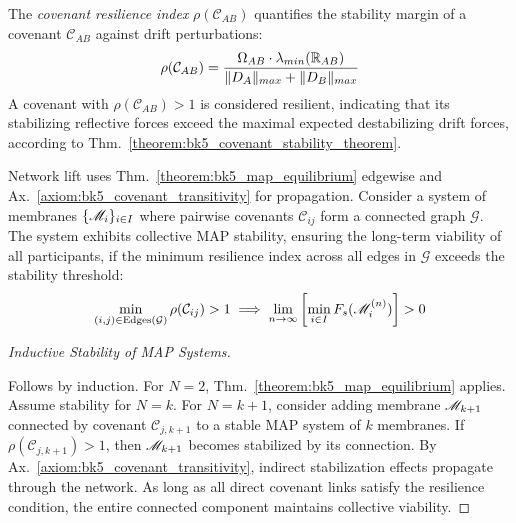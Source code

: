 \begin{definition} \label{definition:bk5_covenant_resilience_index}
The \emph{covenant resilience index} $\rho(\mathcal{C}_{AB})$ quantifies the stability margin of a covenant $\mathcal{C}_{AB}$ against drift perturbations:
\begin{equation}
\rho(\mathcal{C}_{AB}) = \frac{\Omega_{AB} \cdot \lambda_{min}(\mathbb{R}_{AB})}{\|D_A\|_{max} + \|D_B\|_{max}}
\end{equation}
A covenant with $\rho(\mathcal{C}_{AB}) > 1$ is considered resilient, indicating that its stabilizing reflective forces exceed the maximal expected destabilizing drift forces, according to Thm.~\ref{theorem:bk5_covenant_stability_theorem}.
\end{definition}
\begin{lemma} \label{lemma:bk5_multi_membrane_map_extension}
Network lift uses Thm.~\ref{theorem:bk5_map_equilibrium} edgewise and Ax.~\ref{axiom:bk5_covenant_transitivity} for propagation.
Consider a system of membranes $\{\mathscr{M}_i\}_{i \in I}$ where pairwise covenants $\mathcal{C}_{ij}$ form a connected graph $\mathcal{G}$. The system exhibits collective MAP stability, ensuring the long-term viability of all participants, if the minimum resilience index across all edges in $\mathcal{G}$ exceeds the stability threshold:
\begin{equation}
\min_{(i,j) \in \text{Edges}(\mathcal{G})} \rho(\mathcal{C}_{ij}) > 1 \implies \lim_{n \to \infty} \left[ \min_{i \in I} F_s(\mathscr{M}_i^{(n)}) \right] > 0
\end{equation}
\end{lemma}
\begin{proof}[Inductive Stability of MAP Systems]
\label{proof:bk5_inductive_stability_map}
\leavevmode

Follows by induction. For $N=2$, Thm.~\ref{theorem:bk5_map_equilibrium} applies. Assume stability for $N=k$. For $N=k+1$, consider adding membrane $\mathscr{M}_{k+1}$ connected by covenant $\mathcal{C}_{j,k+1}$ to a stable MAP system of $k$ membranes. If $\rho(\mathcal{C}_{j,k+1}) > 1$, then $\mathscr{M}_{k+1}$ becomes stabilized by its connection. By Ax.~\ref{axiom:bk5_covenant_transitivity}, indirect stabilization effects propagate through the network. As long as all direct covenant links satisfy the resilience condition, the entire connected component maintains collective viability.
\end{proof}
